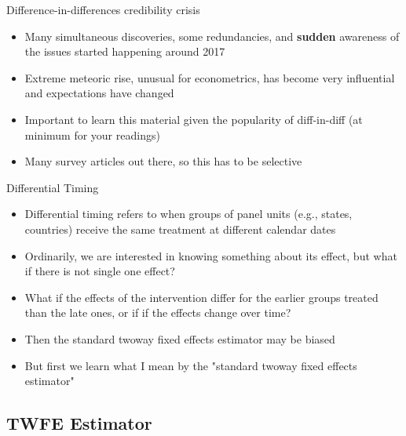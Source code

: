 \documentclass{beamer}
\begin{document}
\begin{frame}{Difference-in-differences credibility crisis}

\begin{itemize}
\item Many simultaneous discoveries, some redundancies, and \textbf{sudden} awareness of the issues started happening around 2017
\item Extreme meteoric rise, unusual for econometrics, has become very influential and expectations have changed
\item Important to learn this material given the popularity of diff-in-diff (at minimum for your readings)
\item Many survey articles out there, so this has to be selective
\end{itemize}

\end{frame}


\begin{frame}{Differential Timing}

\begin{itemize}
\item Differential timing refers to when groups of panel units (e.g., states, countries) receive the same treatment at different calendar dates
\item Ordinarily, we are interested in knowing something about its effect, but what if there is not single one effect?
\item What if the effects of the intervention differ for the earlier groups treated than the late ones, or if if the effects change over time?
\item Then the standard twoway fixed effects estimator may be biased
\item But first we learn what I mean by the "standard twoway fixed effects estimator"
\end{itemize}

\end{frame}




\subsection{TWFE Estimator }
\end{document}
